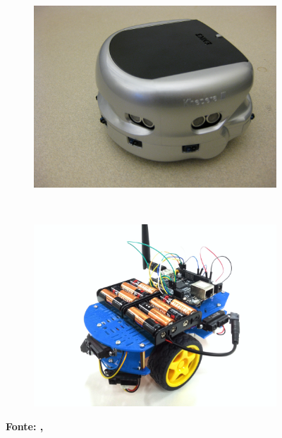 \begin{figure}[ht]
\centering
\caption{Robôs Khepera 3 e QuickBot}
\label{fig:RobosK3QB}
	\begin{subfigure}[b]{0.49\textwidth}%
		\centering
		\includegraphics[trim= 8cm 0cm 0cm 0cm,clip,
scale=0.14]{Figuras/Khepera_III_robot}
	  	\label{fig:test1}
	\end{subfigure}
	~
	\begin{subfigure}[b]{0.49\textwidth}%
		\centering
		\includegraphics[trim={6cm 0cm 3cm 0cm},clip,
scale=0.09]{Figuras/quickbot-blue}
	  	\label{fig:test2}
	\end{subfigure}
	
	\textbf{Fonte: , }
\end{figure}


